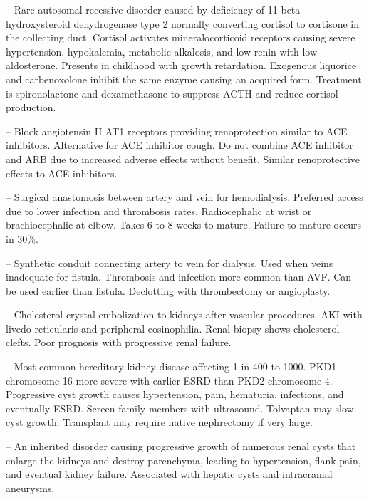 -- Rare autosomal recessive disorder caused by deficiency of 11-beta-hydroxysteroid dehydrogenase type 2 normally converting cortisol to cortisone in the collecting duct. Cortisol activates mineralocorticoid receptors causing severe hypertension, hypokalemia, metabolic alkalosis, and low renin with low aldosterone. Presents in childhood with growth retardation. Exogenous liquorice and carbenoxolone inhibit the same enzyme causing an acquired form. Treatment is spironolactone and dexamethasone to suppress ACTH and reduce cortisol production.

-- Block angiotensin II AT1 receptors providing renoprotection similar to ACE inhibitors. Alternative for ACE inhibitor cough. Do not combine ACE inhibitor and ARB due to increased adverse effects without benefit. Similar renoprotective effects to ACE inhibitors.

-- Surgical anastomosis between artery and vein for hemodialysis. Preferred access due to lower infection and thrombosis rates. Radiocephalic at wrist or brachiocephalic at elbow. Takes 6 to 8 weeks to mature. Failure to mature occurs in 30\%.

-- Synthetic conduit connecting artery to vein for dialysis. Used when veins inadequate for fistula. Thrombosis and infection more common than AVF. Can be used earlier than fistula. Declotting with thrombectomy or angioplasty.

-- Cholesterol crystal embolization to kidneys after vascular procedures. AKI with livedo reticularis and peripheral eosinophilia. Renal biopsy shows cholesterol clefts. Poor prognosis with progressive renal failure.

-- Most common hereditary kidney disease affecting 1 in 400 to 1000. PKD1 chromosome 16 more severe with earlier ESRD than PKD2 chromosome 4. Progressive cyst growth causes hypertension, pain, hematuria, infections, and eventually ESRD. Screen family members with ultrasound. Tolvaptan may slow cyst growth. Transplant may require native nephrectomy if very large.

-- An inherited disorder causing progressive growth of numerous renal cysts that enlarge the kidneys and destroy parenchyma, leading to hypertension, flank pain, and eventual kidney failure. Associated with hepatic cysts and intracranial aneurysms.


